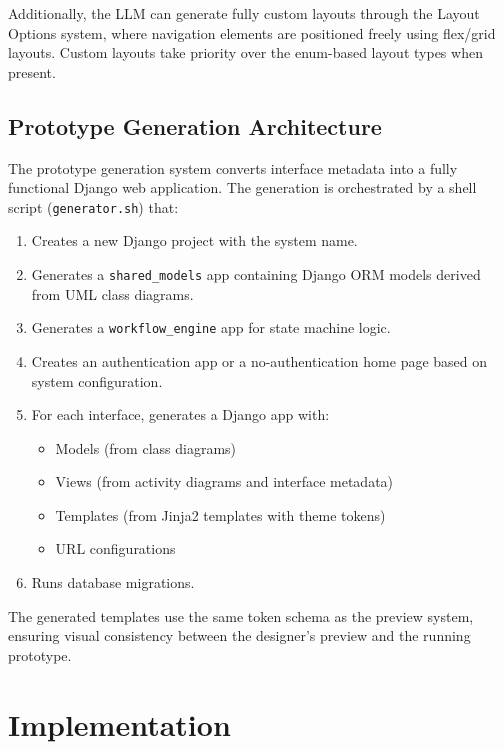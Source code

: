 Additionally, the LLM can generate fully custom layouts through the Layout Options system, where navigation elements are positioned freely using flex/grid layouts. Custom layouts take priority over the enum-based layout types when present.


\subsection{Prototype Generation Architecture}

The prototype generation system converts interface metadata into a fully functional Django web application. The generation is orchestrated by a shell script (\texttt{generator.sh}) that:

\begin{enumerate}
    \item Creates a new Django project with the system name.
    \item Generates a \texttt{shared\_models} app containing Django ORM models derived from UML class diagrams.
    \item Generates a \texttt{workflow\_engine} app for state machine logic.
    \item Creates an authentication app or a no-authentication home page based on system configuration.
    \item For each interface, generates a Django app with:
    \begin{itemize}
        \item Models (from class diagrams)
        \item Views (from activity diagrams and interface metadata)
        \item Templates (from Jinja2 templates with theme tokens)
        \item URL configurations
    \end{itemize}
    \item Runs database migrations.
\end{enumerate}

The generated templates use the same token schema as the preview system, ensuring visual consistency between the designer's preview and the running prototype.



\section{Implementation}

